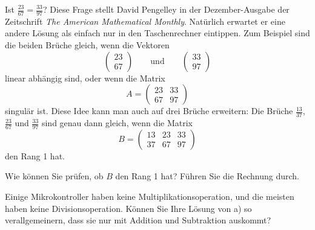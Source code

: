 Ist $\frac{23}{67}=\frac{33}{97}$? Diese Frage stellt David Pengelley
in der Dezember-Ausgabe der Zeitschrift {\it The American Mathematical
Monthly}. Natürlich erwartet er eine andere Lösung als einfach nur
in den Taschenrechner eintippen. Zum Beispiel sind die beiden Brüche
gleich, wenn die Vektoren
\[
\begin{pmatrix}
23\\67
\end{pmatrix}
\qquad\text{und}\qquad
\begin{pmatrix}
33\\97
\end{pmatrix}
\]
linear abhängig sind, oder wenn die Matrix
\[
A=
\begin{pmatrix}
23&33\\
67&97
\end{pmatrix}
\]
singulär ist. Diese Idee kann man auch auf drei Brüche erweitern: Die
Brüche $\frac{13}{37}$, $\frac{23}{67}$ und $\frac{33}{97}$ sind genau
dann gleich, wenn die Matrix
\[
B=\begin{pmatrix}
13&23&33\\
37&67&97
\end{pmatrix}
\]
den Rang 1 hat.


\begin{teilaufgaben}
\item Wie können Sie prüfen, ob $B$ den Rang 1 hat? Führen Sie die
Rechnung durch.
\item Einige Mikrokontroller haben keine Multiplikationsoperation, und
die meisten haben keine Divisionsoperation.
Können Sie Ihre Lösung von a) so verallgemeinern, dass sie nur mit
Addition und Subtraktion auskommt?
\end{teilaufgaben}

